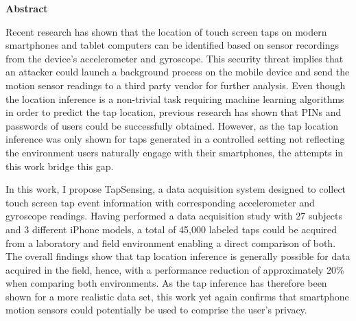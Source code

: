 \thispagestyle{empty}
\vspace*{1.2cm}

\begin{center}
    \textbf{Abstract}
\end{center}

\vspace*{0.5cm}

\noindent

Recent research has shown that the location of touch screen taps on modern smartphones and tablet computers can be identified based on sensor recordings from the device's accelerometer and gyroscope. This security threat implies that an attacker could launch a background process on the mobile device and send the motion sensor readings to a third party vendor for further analysis. Even though the location inference is a non-trivial task requiring machine learning algorithms in order to predict the tap location, previous research has shown that PINs and passwords of users could be successfully obtained. However, as the tap location inference was only shown for taps generated in a controlled setting not reflecting the environment users naturally engage with their smartphones, the attempts in this work bridge this gap.

In this work, I propose TapSensing, a data acquisition system designed to collect touch screen tap event information with corresponding accelerometer and gyroscope readings. Having performed a data acquisition study with 27 subjects and 3 different iPhone models, a total of 45,000 labeled taps could be acquired from a laboratory and field environment enabling a direct comparison of both. The overall findings show that tap location inference is generally possible for data acquired in the field, hence, with a performance reduction of approximately 20\% when comparing both environments. As the tap inference has therefore been shown for a more realistic data set, this work yet again confirms that smartphone motion sensors could potentially be used to comprise the user's privacy.
